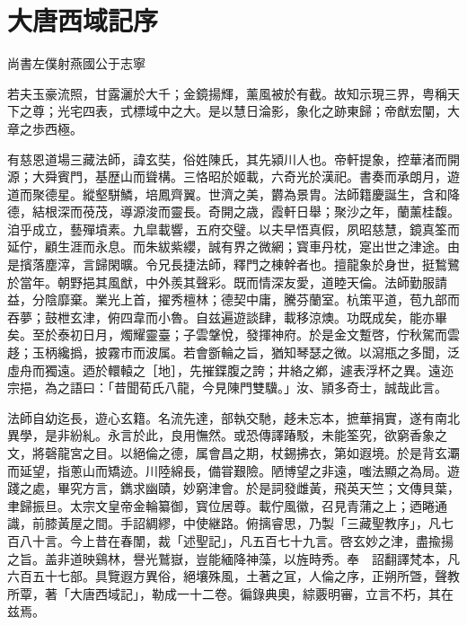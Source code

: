 


\chapter*{大唐西域記序}
\setcounter{chapter}{15}

\hbox{}\hfill
尚書左僕射燕國公于志寧　　

若夫玉豪流照，甘露灑於大千；金鏡揚輝，薰風被於有截。故知示現三界，粤稱天下之尊；光宅四表，式標域中之大。是以慧日淪影，象化之跡東歸；帝猷宏闡，大章之歩西極。

有慈恩道場三藏法師，諱玄奘，俗姓陳氏，其先潁川人也。帝軒提象，控華渚而開源；大舜賓門，基歴山而聳構。三恪昭於姬載，六奇光於漢祀。書奏而承朗月，遊道而聚德星。縱壑駢鱗，培鳳齊翼。世濟之美，欝為景胄。法師籍慶誕生，含和降德，結根深而䓲茂，導源浚而靈長。奇開之歳，霞軒日舉；聚沙之年，蘭薰桂馥。洎乎成立，藝殫墳素。九皐載響，五府交璧。以夫早悟真假，夙昭慈慧，鏡真筌而延佇，顧生涯而永息。而朱紱紫纓，誠有界之微網；寳車丹枕，寔出世之津途。由是擯落塵滓，言歸閑曠。令兄長捷法師，釋門之棟幹者也。擅龍象於身世，挺鶖鷺於當年。朝野挹其風猷，中外羨其聲彩。既而情深友愛，道睦天倫。法師勤服請益，分陰靡棄。業光上首，擢秀檀林；德契中庸，騰芬蘭室。杭策平道，苞九部而吞夢；鼓枻玄津，俯四韋而小魯。自兹遍遊談肆，載移涼燠。功既成矣，能亦畢矣。至於泰初日月，燭耀靈臺；子雲鞶悅，發揮神府。於是金文蹔啓，佇秋駕而雲趍；玉柄纔撝，披霧市而波属。若會斵輪之旨，猶知琴瑟之微。以瀉瓶之多聞，泛虛舟而獨遠。迺於轘轅之［地］，先摧鍱腹之誇；井絡之鄕，遽表浮杯之異。遠迩宗挹，為之語曰：「昔聞荀氏八龍，今見陳門雙驥。」汝、頴多奇士，誠哉此言。

法師自幼迄長，遊心玄籍。名流先達，部執交馳，趍未忘本，摭華捐實，遂有南北異學，是非紛糺。永言於此，良用憮然。或恐傳譯踳駁，未能筌究，欲窮香象之文，將磬龍宮之目。以絕倫之德，属會昌之期，杖錫拂衣，第如遐境。於是背玄㶚而延望，指蔥山而矯迹。川陸綿長，備甞艱險。陋博望之非遠，嗤法顯之為局。遊踐之處，畢究方言，鐫求幽賾，妙窮津會。於是詞發雌黃，飛英天竺；文傳貝葉，聿歸振旦。太宗文皇帝金輪纂御，寳位居尊。載佇風徽，召見青蒲之上；迺睠通識，前膝黃屋之間。手詔綢繆，中使継路。俯摛睿思，乃製「三藏聖教序」，凡七百八十言。今上昔在春闈，裁「述聖記」，凡五百七十九言。啓玄妙之津，盡揄揚之旨。盖非道映鷄林，譽光鷲嶽，豈能緬降神藻，以旌時秀。奉　詔翻譯梵本，凡六百五十七部。具覽遐方異俗，絕壤殊風，土著之冝，人倫之序，正朔所曁，聲教所覃，著「大唐西域記」，勒成一十二卷。徧錄典奧，綜覈明審，立言不朽，其在兹焉。

